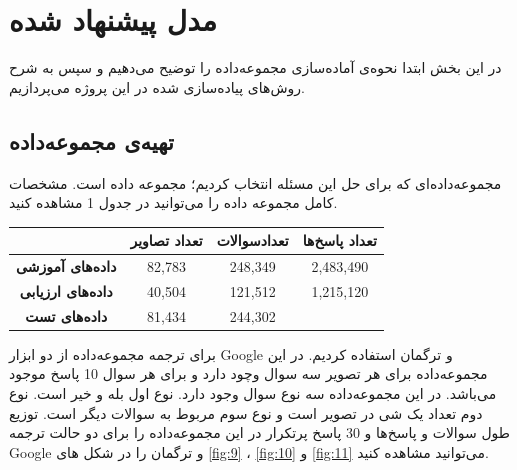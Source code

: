 \section{مدل پیشنهاد شده}
{
	در این بخش ابتدا نحوه‌ی آماده‌سازی مجموعه‌داده را توضیح می‌دهیم و سپس به شرح روش‌های پیاده‌سازی شده در این پروژه می‌پردازیم.
	
	\subsection{تهیه‌ی مجموعه‌داده}
	{
		مجموعه‌داده‌ای که برای حل این مسئله انتخاب کردیم؛ مجموعه داده
		 \href{https://visualqa.org/vqa_v1_download.html}{} 
		 است. مشخصات کامل مجموعه داده را می‌توانید در جدول 1 مشاهده کنید.
		 \begin{center}
		 	\begin{tabular}{ c c c c } 
		 		\hline
		 		& \textbf{تعداد تصاویر} & \textbf{تعدادسوالات} & \textbf{تعداد پاسخ‌ها} \\
		 		\hline \hline
		 		\textbf{داده‌های آموزشی} & 82,783 & 248,349 &  2,483,490 \\
				
				\textbf{داده‌های ارزیابی} & 40,504 & 121,512 & 1,215,120 \\
				
				\textbf{داده‌های تست} & 81,434 & 244,302 & \\
				\hline
		 	\end{tabular}
		 \end{center}
		برای ترجمه مجموعه‌داده از دو ابزار Google‌ و ترگمان استفاده کردیم. در این مجموعه‌داده برای هر تصویر سه سوال وچود دارد و برای هر سوال 10 پاسخ موجود می‌باشد. در این مجموعه‌داده سه نوع سوال وجود دارد. نوع اول بله و خیر است. نوع دوم تعداد یک شی در تصویر است و نوع سوم مربوط به سوالات دیگر است. توزیع طول سوالات و پاسخ‌ها و 30 پاسخ پرتکرار در این مجموعه‌داده را برای دو حالت ترجمه Google‌‌ و ترگمان را در شکل های 
		\ref{fig:9}
		،
		\ref{fig:10}
		و 
		\ref{fig:11}
		می‌توانید مشاهده کنید. 
	}
}
